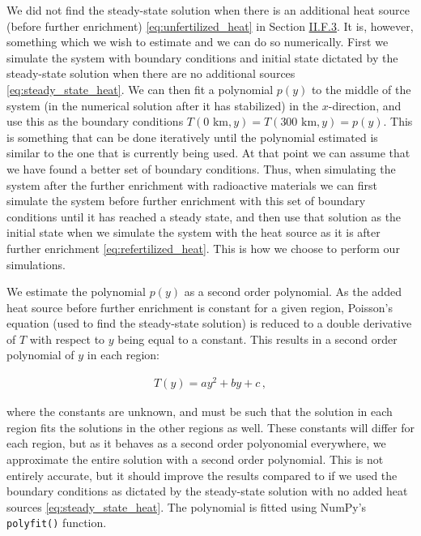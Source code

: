 \documentclass[reprint,english,notitlepage]{revtex4-1}  %
\begin{document}
We did not find the steady-state solution when there is an additional heat source (before further enrichment) \eqref{eq:unfertilized_heat} in Section \hyperref[sec:formalism_heat_eq_with_source_term_analytical_sol]{II.F.3}.
It is, however, something which we wish to estimate and we can do so numerically. First we simulate the system with boundary conditions and initial state dictated by the steady-state solution when there are no additional sources \eqref{eq:steady_state_heat}. We can then fit a polynomial $p(y)$ to the middle of the system (in the numerical solution after it has stabilized) in the $x$-direction, and use this as the boundary conditions $T(0 \text{ km},y) = T(300 \text{ km},y) = p(y)$. This is something that can be done iteratively until the polynomial estimated is similar to the one that is currently being used. At that point we can assume that we have found a better set of boundary conditions. Thus, when simulating the system after the further enrichment with radioactive materials we can first simulate the system before further enrichment with this set of boundary conditions until it has reached a steady state, and then use that solution as the initial state when we simulate the system with the heat source as it is after further enrichment \eqref{eq:refertilized_heat}. This is how we choose to perform our simulations.

We estimate the polynomial $p(y)$ as a second order polynomial. As the added heat source before further enrichment is constant for a given region, Poisson's equation (used to find the steady-state solution) is reduced to a double derivative of $T$ with respect to $y$ being equal to a constant. This results in a second order polynomial of $y$ in each region:

\begin{align*}
T(y) = ay^2 + by + c \, ,
\end{align*} 

where the constants are unknown, and must be such that the solution in each region fits the solutions in the other regions as well. These constants will differ for each region, but as it behaves as a second order polyonomial everywhere, we approximate the entire solution with a second order polynomial. This is not entirely accurate, but it should improve the results compared to if we used the boundary conditions as dictated by the steady-state solution with no added heat sources \eqref{eq:steady_state_heat}. The polynomial is fitted using NumPy's \citep{numpy} \verb+polyfit()+ function.
\end{document}
